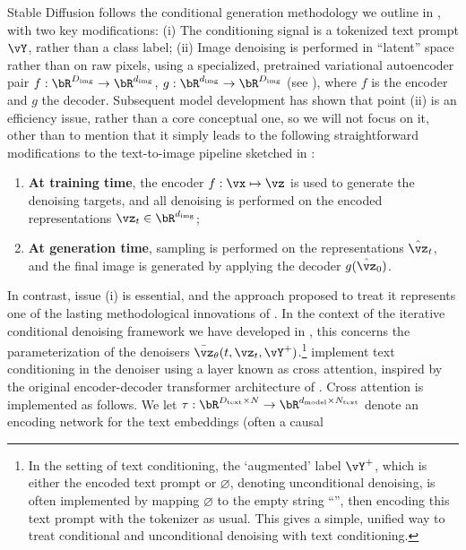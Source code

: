 \documentclass[../../book-main.tex]{subfiles}
\begin{document}
Stable Diffusion follows the conditional generation methodology we outline in
, with two key modifications: (i) The conditioning signal is a
tokenized text prompt $\vY$, rather than a class label; (ii) Image denoising is
performed in ``latent'' space rather than on raw pixels, using a specialized,
pretrained variational autoencoder pair $f : \bR^{D_{\mathrm{img}}} \to
\bR^{d_{\mathrm{img}}}$, $g : \bR^{d_{\mathrm{img}}} \to
\bR^{D_{\mathrm{img}}}$ (see ), where $f$
is the encoder and $g$ the decoder. Subsequent model development has shown that
point (ii) is an efficiency issue, rather than a core conceptual one, so we will
not focus on it, other than to mention that it simply leads to the following
straightforward modifications to the text-to-image pipeline sketched in
: 
\begin{enumerate}
  \item \textbf{At training time},
    the encoder $f : \vx \mapsto \vz$ is used to generate the denoising targets, and
    all denoising is performed on the encoded representations $\vz_t \in
    \bR^{d_{\mathrm{img}}}$;
  \item \textbf{At generation time}, sampling is performed on the
    representations $\hat{\vz}_t$, and
    the final image is generated by applying the decoder $g(\hat{\vz}_0)$.
\end{enumerate}
In contrast, issue (i) is essential, and the approach proposed to treat it
represents one of the lasting methodological innovations of
\textcite{rombach2022high}.
In the context of the iterative conditional denoising framework we have
developed in , this concerns the parameterization of the denoisers
$\bar{\vz}_{\theta}(t, \vz_t, \vY^+)$.\footnote{In the setting of text
conditioning, the `augmented' label $\vY^+$, which is either the encoded text
prompt or $\varnothing$, denoting unconditional denoising, is often implemented
by mapping $\varnothing$ to the empty string ``'', then encoding this text
prompt with the tokenizer as usual. This gives a simple, unified way to treat
conditional and unconditional denoising with text conditioning.}
\textcite{rombach2022high} implement text conditioning in the denoiser using
a layer known as cross attention, inspired by the original encoder-decoder
transformer architecture of \textcite{vaswani2017attention}. Cross attention is
implemented as follows. We let $\tau : \bR^{D_{\mathrm{text}} \times N} \to
\bR^{d_{\mathrm{model}} \times N_{\mathrm{text}}}$
denote an encoding network for the text embeddings (often a causal
\end{document}
